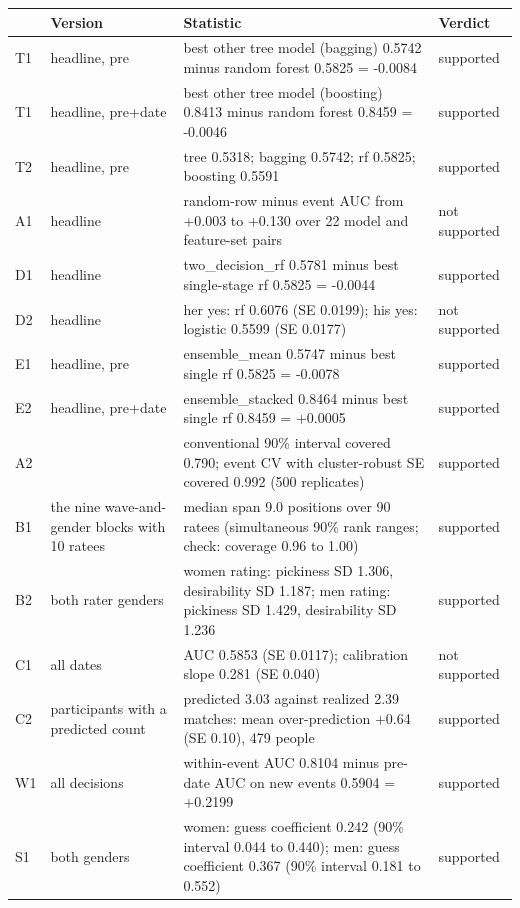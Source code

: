 \documentclass[11pt]{article}
\begin{document}
\footnotesize
\begin{longtable}{lL{2.6cm}L{9.6cm}l}
\toprule
\textbf{} & \textbf{Version} & \textbf{Statistic} & \textbf{Verdict} \\
\midrule
\endhead
T1 & headline, pre & best other tree model (bagging) 0.5742 minus random forest 0.5825 = -0.0084 & supported \\
T1 & headline, pre+date & best other tree model (boosting) 0.8413 minus random forest 0.8459 = -0.0046 & supported \\
T2 & headline, pre & tree 0.5318; bagging 0.5742; rf 0.5825; boosting 0.5591 & supported \\
A1 & headline & random-row minus event AUC from +0.003 to +0.130 over 22 model and feature-set pairs & not supported \\
D1 & headline & two\_decision\_rf 0.5781 minus best single-stage rf 0.5825 = -0.0044 & supported \\
D2 & headline & her yes: rf 0.6076 (SE 0.0199); his yes: logistic 0.5599 (SE 0.0177) & not supported \\
E1 & headline, pre & ensemble\_mean 0.5747 minus best single rf 0.5825 = -0.0078 & supported \\
E2 & headline, pre+date & ensemble\_stacked 0.8464 minus best single rf 0.8459 = +0.0005 & supported \\
A2 &  & conventional 90\% interval covered 0.790; event CV with cluster-robust SE covered 0.992 (500 replicates) & supported \\
B1 & the nine wave-and-gender blocks with 10 ratees & median span 9.0 positions over 90 ratees (simultaneous 90\% rank ranges; check: coverage 0.96 to 1.00) & supported \\
B2 & both rater genders & women rating: pickiness SD 1.306, desirability SD 1.187; men rating: pickiness SD 1.429, desirability SD 1.236 & supported \\
C1 & all dates & AUC 0.5853 (SE 0.0117); calibration slope 0.281 (SE 0.040) & not supported \\
C2 & participants with a predicted count & predicted 3.03 against realized 2.39 matches: mean over-prediction +0.64 (SE 0.10), 479 people & supported \\
W1 & all decisions & within-event AUC 0.8104 minus pre-date AUC on new events 0.5904 = +0.2199 & supported \\
S1 & both genders & women: guess coefficient 0.242 (90\% interval 0.044 to 0.440); men: guess coefficient 0.367 (90\% interval 0.181 to 0.552) & supported \\

\end{longtable}
\end{document}
